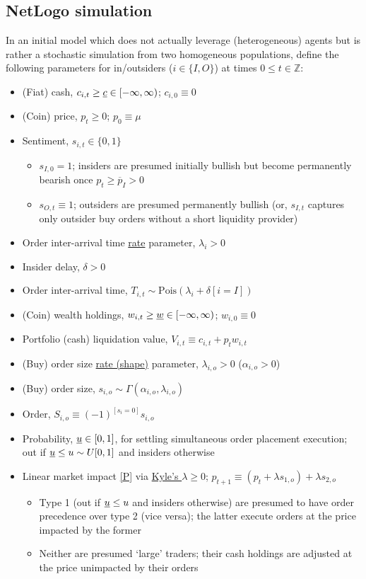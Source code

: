 \documentclass{article}
\begin{document}
\subsection{NetLogo simulation}\label{2.2}
In an initial model which does not actually leverage (heterogeneous) agents but is rather a stochastic simulation from two homogeneous populations, define the following parameters for in/outsiders ($i\in\{I,O\}$) at times $0\le t\in\mathbb Z$:
\begin{itemize}
    \item (Fiat) cash, $c_{i,t}\ge\uline c\in[-\infty,\infty)$; $c_{i,0}\equiv0$
    \item (Coin) price, $p_t\ge0$; $p_0\equiv\mu$
    \item Sentiment, $s_{i,t}\in\{0,1\}$
    \begin{itemize}
        \item $s_{I,0}=1$; insiders are presumed initially bullish but become permanently bearish once $p_t\ge\overline{p}_I>0$
        \item $s_{O,t}\equiv1$; outsiders are presumed permanently bullish (or, $s_{I,t}$ captures only outsider buy orders without a short liquidity provider)
    \end{itemize}
    \item Order inter-arrival time \href{https://en.wikipedia.org/wiki/Poisson_distribution}{rate} parameter, $\lambda_i>0$
    \item Insider delay, $\delta>0$
    \item Order inter-arrival time, $T_{i,t}\sim\text{Pois}(\lambda_i+\delta[i=I])$
    \item (Coin) wealth holdings, $w_{i,t}\ge\uline w\in[-\infty,\infty)$; $w_{i,0}\equiv0$
    \item Portfolio (cash) liquidation value, $V_{i,t}\equiv c_{i,t}+p_tw_{i,t}$
    \item (Buy) order size \href{https://en.wikipedia.org/wiki/Gamma_distribution}{rate (shape)} parameter, $\lambda_{i,o}>0$ ($\alpha_{i,o}>0$)
    \item (Buy) order size, $s_{i,o}\sim\Gamma(\alpha_{i,o},\lambda_{i,o})$
    \item Order, $S_{i,o}\equiv(-1)^{[s_i=0]}s_{i,o}$
    \item Probability, $\uline u\in[0,1]$, for settling simultaneous order placement execution; out if $\uline u\le u\sim U[0,1]$ and insiders otherwise
    \item Linear market impact \eqref{P} via \href{https://en.wikipedia.org/wiki/Market_impact#Measuring_market_impact}{Kyle's $\lambda\ge0$}; $p_{t+1}\equiv(p_t+\lambda s_{1,o})+\lambda s_{2,o}$
    \begin{itemize}
        \item Type 1 (out if $\uline u\le u$ and insiders otherwise) are presumed to have order precedence over type 2 (vice versa); the latter execute orders at the price impacted by the former
        \item Neither are presumed `large' traders; their cash holdings are adjusted at the price unimpacted by their orders
    \end{itemize}
\end{itemize}
\end{document}
